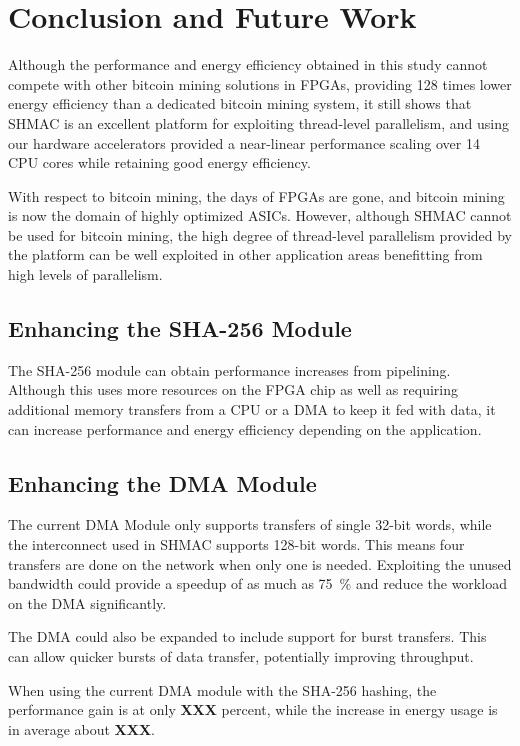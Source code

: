 \chapter{Conclusion and Future Work}
\label{cha:conclusion}

Although the performance and energy efficiency obtained in this study cannot compete
with other bitcoin mining solutions in FPGAs, providing 128 times lower energy efficiency than
a dedicated bitcoin mining system, it still shows that SHMAC is an excellent platform
for exploiting thread-level parallelism, and using our hardware accelerators provided a
near-linear performance scaling over 14 CPU cores while retaining good energy efficiency.

With respect to bitcoin mining, the days of FPGAs are gone, and bitcoin mining is now
the domain of highly optimized ASICs. However, although SHMAC cannot be used for bitcoin
mining, the high degree of thread-level parallelism provided by the platform can be well exploited
in other application areas benefitting from high levels of parallelism.

\section{Enhancing the SHA-256 Module}

The SHA-256 module can obtain performance increases from pipelining. Although this uses more
resources on the FPGA chip as well as requiring additional memory transfers from a CPU or a
DMA to keep it fed with data, it can increase performance and energy efficiency depending
on the application.

\section{Enhancing the DMA Module}

The current DMA Module only supports transfers of single 32-bit words, while the interconnect used in SHMAC supports 128-bit words.
This means four transfers are done on the network when only one is needed. Exploiting the unused bandwidth could
provide a speedup of as much as 75~\% and reduce the workload on the DMA significantly.

The DMA could also be expanded to include support for burst transfers. This can allow quicker bursts of data
transfer, potentially improving throughput.

When using the current DMA module with the SHA-256 hashing, the performance gain is at only \textbf{XXX} percent, while the increase in energy usage is in average about  \textbf{XXX}.

